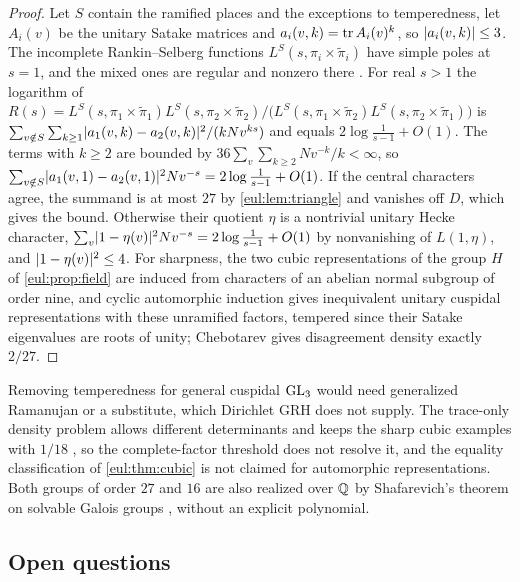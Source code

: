 \begin{proof}
Let $S$ contain the ramified places and the exceptions to temperedness, let $A_i(v)$ be the unitary Satake matrices
and $a_i(v,k)=\operatorname{tr} A_i(v)^k$, so $\lvert a_i(v,k)\rvert\le3$. The incomplete Rankin--Selberg functions
$L^S(s,\pi_i\times\widetilde\pi_i)$ have simple poles at $s=1$, and the mixed ones are regular and nonzero there
\cite[Section~2]{Rajan2003Strong}. For real $s>1$ the logarithm of
$R(s)=L^S(s,\pi_1\times\widetilde\pi_1)L^S(s,\pi_2\times\widetilde\pi_2)/\bigl(L^S(s,\pi_1\times\widetilde\pi_2)L^S(s,\pi_2\times\widetilde\pi_1)\bigr)$
is $\sum_{v\notin S}\sum_{k\ge1}\lvert a_1(v,k)-a_2(v,k)\rvert^2/(kNv^{ks})$ and equals $2\log\frac1{s-1}+O(1)$. The terms
with $k\ge2$ are bounded by $36\sum_v\sum_{k\ge2}Nv^{-k}/k<\infty$, so
$\sum_{v\notin S}\lvert a_1(v,1)-a_2(v,1)\rvert^2Nv^{-s}=2\log\frac1{s-1}+O(1)$. If the central characters agree, the summand
is at most $27$ by \cref{eul:lem:triangle} and vanishes off $D$, which gives the bound. Otherwise their quotient
$\eta$ is a nontrivial unitary Hecke character, $\sum_v\lvert1-\eta(v)\rvert^2Nv^{-s}=2\log\frac1{s-1}+O(1)$ by
nonvanishing of $L(1,\eta)$, and $\lvert1-\eta(v)\rvert^2\le4$. For sharpness, the two cubic representations of the group
$H$ of \cref{eul:prop:field} are induced from characters of an abelian normal subgroup of order nine, and cyclic
automorphic induction \cite[Chapter~3, Sections~6--7]{ArthurClozel1989Simple} gives inequivalent unitary cuspidal
representations with these unramified factors, tempered since their Satake eigenvalues are roots of unity; Chebotarev
gives disagreement density exactly $2/27$.
\end{proof}

Removing temperedness for general cuspidal $\operatorname{GL}_3$ would need generalized Ramanujan or a substitute, which Dirichlet
GRH does not supply. The trace-only density problem allows different determinants and keeps the sharp cubic examples
with $1/18$ \cite{MartinWalji2017Distinguishing,Walji2020Conjectural}, so the complete-factor threshold does not
resolve it, and the equality classification of \cref{eul:thm:cubic} is not claimed for automorphic representations.
Both groups of order $27$ and $16$ are also realized over $\mathbb{Q}$ by Shafarevich's theorem on solvable Galois groups
\cite{SchmidtWingberg1998Safarevic}, without an explicit polynomial.

\subsection{Open questions}\label{eul:sec:open}
{\raggedright{}}

